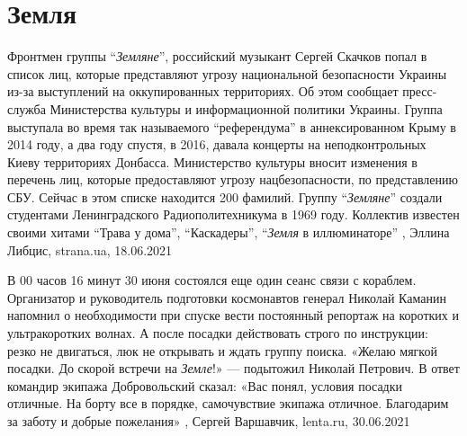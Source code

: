  
 
 
 
 
\chapter{Земля}
\label{sec:slova.zemlja}

Фронтмен группы \enquote{\emph{Земляне}}, российский музыкант Сергей Скачков
попал в список лиц, которые представляют угрозу национальной безопасности
Украины из-за выступлений на оккупированных территориях.  Об этом сообщает
пресс-служба Министерства культуры и информационной политики Украины.  Группа
выступала во время так называемого \enquote{референдума} в аннексированном
Крыму в 2014 году, а два году спустя, в 2016, давала концерты на
неподконтрольных Киеву территориях Донбасса.  Министерство культуры вносит
изменения в перечень лиц, которые предоставляют угрозу нацбезопасности, по
представлению СБУ. Сейчас в этом списке находится 200 фамилий.  Группу
\enquote{\emph{Земляне}} создали студентами Ленинградского Радиополитехникума в
1969 году. Коллектив известен своими хитами \enquote{Трава у дома},
\enquote{Каскадеры}, \enquote{\emph{Земля} в иллюминаторе}
, 
Эллина Либцис, strana.ua, 18.06.2021

В 00 часов 16 минут 30 июня состоялся еще один сеанс связи с кораблем.
Организатор и руководитель подготовки космонавтов генерал Николай Каманин
напомнил о необходимости при спуске вести постоянный репортаж на коротких и
ультракоротких волнах. А после посадки действовать строго по инструкции: резко
не двигаться, люк не открывать и ждать группу поиска.  «Желаю мягкой посадки.
До скорой встречи на \emph{Земле}!» — подытожил Николай Петрович. В ответ
командир экипажа Добровольский сказал: «Вас понял, условия посадки отличные. На
борту все в порядке, самочувствие экипажа отличное.  Благодарим за заботу и
добрые пожелания»
, Сергей Варшавчик, lenta.ru, 30.06.2021

